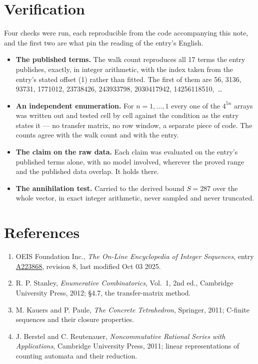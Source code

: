 \documentclass[11pt]{article}
\theoremstyle{definition}
\begin{document}
\section{Verification}

Four checks were run, each reproducible from the code accompanying this note, and the first two are what pin the reading of the entry's English.

\begin{itemize}

\item {\bfseries The published terms.} The walk count reproduces all 17 terms the entry publishes, exactly, in integer arithmetic, with the index taken from the entry's stated offset (1) rather than fitted. The first of them are 56, 3136, 93731, 1771012, 23738426, 243933798, 2030417942, 14256118510,~\dots

\item {\bfseries An independent enumeration.} For $n = 1,\dots,1$ every one of the $4^{5n}$ arrays was written out and tested cell by cell against the condition as the entry states it --- no transfer matrix, no row window, a separate piece of code. The counts agree with the walk count and with the entry.

\item {\bfseries The claim on the raw data.} Each claim was evaluated on the entry's published terms alone, with no model involved, wherever the proved range and the published data overlap. It holds there.

\item {\bfseries The annihilation test.} Carried to the derived bound $S = 287$ over the whole vector, in exact integer arithmetic, never sampled and never truncated.

\end{itemize}

\section{References}

\begin{enumerate}

\item OEIS Foundation Inc., \emph{The On-Line Encyclopedia of Integer Sequences}, entry \href{https://oeis.org/A223868}{A223868}, revision 8, last modified Oct 03 2025.

\item R. P. Stanley, \emph{Enumerative Combinatorics}, Vol.~1, 2nd ed., Cambridge University Press, 2012; \S4.7, the transfer-matrix method.

\item M. Kauers and P. Paule, \emph{The Concrete Tetrahedron}, Springer, 2011; C-finite sequences and their closure properties.

\item J. Berstel and C. Reutenauer, \emph{Noncommutative Rational Series with Applications}, Cambridge University Press, 2011; linear representations of counting automata and their reduction.

\end{enumerate}
\end{document}
